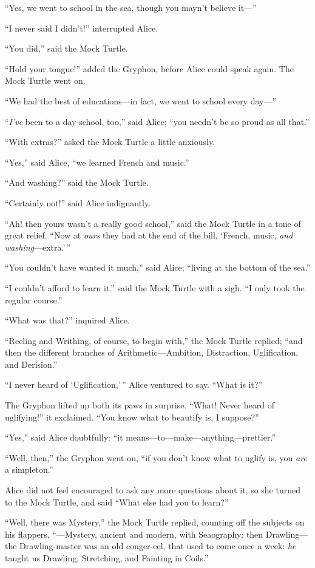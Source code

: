 \documentclass[book, 20pt]{extbook}
\begin{document}
``Yes, we went to school in the sea, though you mayn't believe it---''

``I never said I didn't!'' interrupted Alice.

``You did,'' said the Mock Turtle.

``Hold your tongue!'' added the Gryphon, before Alice could speak again.
The Mock Turtle went on.

``We had the best of educations---in fact, we went to school every
day---''

``\emph{I've} been to a day-school, too,'' said Alice; ``you needn't be
so proud as all that.''

``With extras?'' asked the Mock Turtle a little anxiously.

``Yes,'' said Alice, ``we learned French and music.''

``And washing?'' said the Mock Turtle.

``Certainly not!'' said Alice indignantly.

``Ah! then yours wasn't a really good school,'' said the Mock Turtle in
a tone of great relief. ``Now at \emph{ours} they had at the end of the
bill, `French, music, \emph{and washing}---extra.'\,''

``You couldn't have wanted it much,'' said Alice; ``living at the bottom
of the sea.''

``I couldn't afford to learn it.'' said the Mock Turtle with a sigh. ``I
only took the regular course.''

``What was that?'' inquired Alice.

``Reeling and Writhing, of course, to begin with,'' the Mock Turtle
replied; ``and then the different branches of Arithmetic---Ambition,
Distraction, Uglification, and Derision.''

``I never heard of `Uglification,'\,'' Alice ventured to say. ``What is
it?''

The Gryphon lifted up both its paws in surprise. ``What! Never heard of
uglifying!'' it exclaimed. ``You know what to beautify is, I suppose?''

``Yes,'' said Alice doubtfully: ``it
means---to---make---anything---prettier.''

``Well, then,'' the Gryphon went on, ``if you don't know what to uglify
is, you \emph{are} a simpleton.''

Alice did not feel encouraged to ask any more questions about it, so she
turned to the Mock Turtle, and said ``What else had you to learn?''

``Well, there was Mystery,'' the Mock Turtle replied, counting off the
subjects on his flappers, ``---Mystery, ancient and modern, with
Seaography: then Drawling---the Drawling-master was an old conger-eel,
that used to come once a week: \emph{he} taught us Drawling, Stretching,
and Fainting in Coils.''
\end{document}
